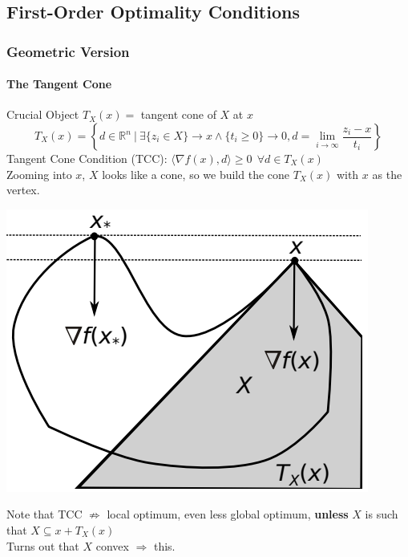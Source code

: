 \documentclass[10pt]{report}
\begin{document}
\subsection{First-Order Optimality Conditions}
\subsubsection{Geometric Version}
\paragraph{The Tangent Cone} Crucial Object $T_X(x) =$ tangent cone of $X$ at $x$
$$T_X(x) = \left\{d\in \mathbb{R}^n\:|\:\exists\{z_i\in X\}\rightarrow x\wedge \{t_i\geq 0\}\rightarrow 0, d=\lim_{i\to\infty}\frac{z_i-x}{t_i}\right\}$$
Tangent Cone Condition (TCC): $\langle\nabla f(x),d\rangle \geq 0\:\:\forall d\in T_X(x)$\\Zooming into $x$, $X$ looks like a cone, so we build the cone $T_X(x)$ with $x$ as the vertex.
\begin{center}
	\includegraphics[scale=0.75]{9.png}
\end{center}
Note that TCC $\not\Rightarrow$ local optimum, even less global optimum, \textbf{unless} $X$ is such that $X\subseteq x + T_X(x)$\\
Turns out that $X$ convex $\Rightarrow$ this.
\end{document}
